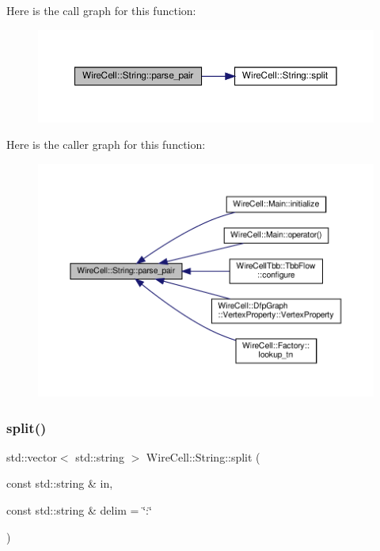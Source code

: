 Here is the call graph for this function\+:
\nopagebreak
\begin{figure}[H]
\begin{center}
\leavevmode
\includegraphics[width=350pt]{namespace_wire_cell_1_1_string_aa275a51c718c16893c21d2a915cab1e6_cgraph}
\end{center}
\end{figure}
Here is the caller graph for this function\+:
\nopagebreak
\begin{figure}[H]
\begin{center}
\leavevmode
\includegraphics[width=350pt]{namespace_wire_cell_1_1_string_aa275a51c718c16893c21d2a915cab1e6_icgraph}
\end{center}
\end{figure}
\mbox{\label{namespace_wire_cell_1_1_string_aef23d7b89dbe21e34a499c9156dd1e60}} 
\subsubsection{\texorpdfstring{split()}{split()}}
{\footnotesize\ttfamily std\+::vector$<$ std\+::string $>$ Wire\+Cell\+::\+String\+::split (\begin{DoxyParamCaption}\item[{const std\+::string \&}]{in,  }\item[{const std\+::string \&}]{delim = {\ttfamily \char`\"{}\+:\char`\"{}} }\end{DoxyParamCaption})}



